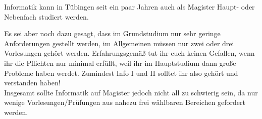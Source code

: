 Informatik kann in Tübingen seit ein paar Jahren auch als Magister Haupt- oder
Nebenfach studiert werden.

Es sei aber noch dazu gesagt, dass im Grundstudium nur sehr geringe Anforderungen gestellt
werden, im Allgemeinen müssen nur zwei oder drei Vorlesungen gehört werden. Erfahrungsgemäß
tut ihr euch keinen Gefallen, wenn ihr die Pflichten nur minimal erfüllt, weil ihr im
Hauptstudium dann große Probleme haben werdet. Zumindest Info I und II solltet ihr also
gehört und verstanden haben!\\
Insgesamt sollte Informatik auf Magister jedoch nicht all zu schwierig sein, da nur
wenige Vorlesungen/Prüfungen aus nahezu frei wählbaren Bereichen gefordert werden.


